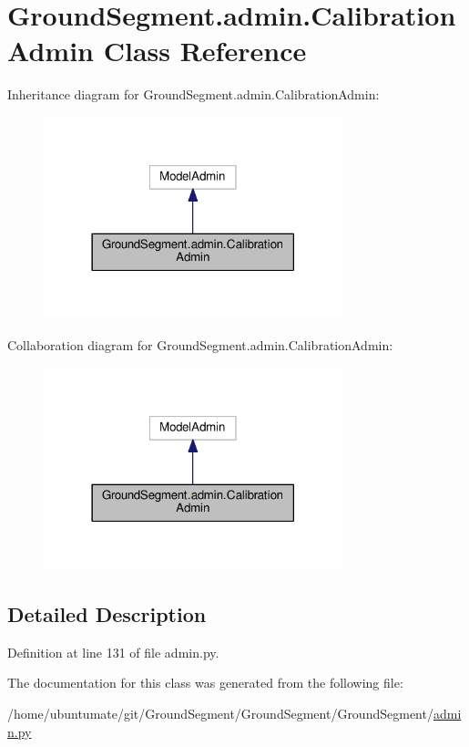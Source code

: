 \hypertarget{class_ground_segment_1_1admin_1_1_calibration_admin}{}\section{Ground\+Segment.\+admin.\+Calibration\+Admin Class Reference}
\label{class_ground_segment_1_1admin_1_1_calibration_admin}


Inheritance diagram for Ground\+Segment.\+admin.\+Calibration\+Admin\+:\nopagebreak
\begin{figure}[H]
\begin{center}
\leavevmode
\includegraphics[width=246pt]{class_ground_segment_1_1admin_1_1_calibration_admin__inherit__graph}
\end{center}
\end{figure}


Collaboration diagram for Ground\+Segment.\+admin.\+Calibration\+Admin\+:\nopagebreak
\begin{figure}[H]
\begin{center}
\leavevmode
\includegraphics[width=246pt]{class_ground_segment_1_1admin_1_1_calibration_admin__coll__graph}
\end{center}
\end{figure}


\subsection{Detailed Description}


Definition at line 131 of file admin.\+py.



The documentation for this class was generated from the following file\+:\begin{DoxyCompactItemize}
\item 
/home/ubuntumate/git/\+Ground\+Segment/\+Ground\+Segment/\+Ground\+Segment/\hyperlink{admin_8py}{admin.\+py}\end{DoxyCompactItemize}
